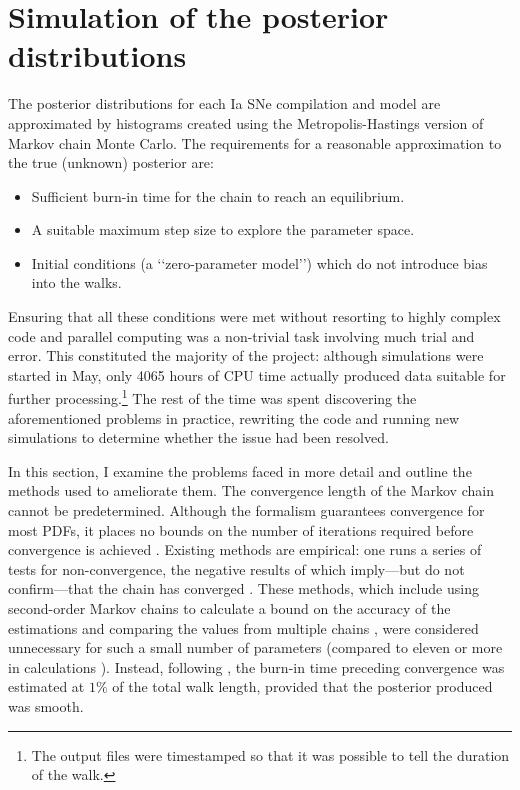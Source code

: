 \section{Simulation of the posterior distributions}
\label{sec:4.3}

The posterior distributions for each Ia SNe compilation and model are approximated by histograms created using the Metropolis-Hastings version of Markov chain Monte Carlo. The requirements for a reasonable approximation to the true (unknown) posterior are:

\begin{itemize}
    \item Sufficient burn-in time for the chain to reach an equilibrium.
    \item A suitable maximum step size to explore the parameter space.
    \item Initial conditions (a \lq\lq{}zero-parameter model\rq\rq{}) which do not introduce bias into the walks.
\end{itemize}

Ensuring that all these conditions were met without resorting to highly complex code and parallel computing was a non-trivial task involving much trial and error. This constituted the majority of the project: although simulations were started in May, only 4065 hours of CPU time actually produced data suitable for further processing.\footnote{The output files were timestamped so that it was possible to tell the duration of the walk.} The rest of the time was spent discovering the aforementioned problems in practice, rewriting the code and running new simulations to determine whether the issue had been resolved. 

In this section, I examine the problems faced in more detail and outline the methods used to ameliorate them. The convergence length of the Markov chain cannot be predetermined. Although the \mcmc{} formalism guarantees convergence for most PDFs, it places no bounds on the number of iterations required before convergence is achieved \cite{Gregory2005,Dunkley2005,Christensen2001}. Existing methods are empirical: one runs a series of tests for non-convergence, the negative results of which imply---but do not confirm---that the chain has converged \cite{Christensen2001}. These methods, which include using second-order Markov chains to calculate a bound on the accuracy of the estimations and comparing the values from multiple chains \cite{Dunkley2005}, were considered unnecessary for such a small number of parameters (compared to eleven or more in \cmb{} calculations \cite{LewisBridle2002}). Instead, following \cite{Gregory2005}, the burn-in time preceding convergence was estimated at $1\%$ of the total walk length, provided that the posterior produced was smooth. 

